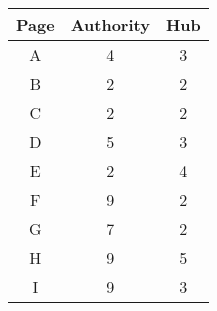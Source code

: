 \documentclass[12pt,english]{article}
\begin{document}
\begin{minipage}[c]{0.5\textwidth}
\centering
\begin{tabular}{|c|c|c|}
\hline
 Page & Authority & Hub \\
\hline
 A & 4 & 3 \\ 
 B & 2 & 2 \\
 C & 2 & 2 \\ 
 D & 5 & 3 \\
 E & 2 & 4 \\ 
 F & 9 & 2 \\
 G & 7 & 2 \\ 
 H & 9 & 5 \\
 I & 9 & 3 \\
\hline
\end{tabular}
\end{minipage}
\end{document}
